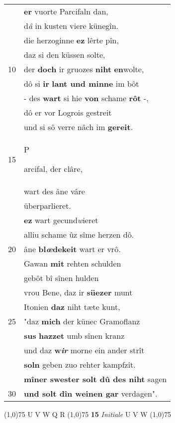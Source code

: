 \documentclass[8pt,a4paper,notitlepage]{article}
\begin{document}
\begin{table}[ht]
\begin{minipage}[t]{0.5\linewidth}
\begin{tabular}{rl}
 & \textbf{er} vuorte Parcifaln dan,\\ 
 & d\textit{â} in kusten viere künegîn.\\ 
 & die herzoginne \textbf{ez} lêrte pîn,\\ 
 & daz si den küssen solte,\\ 
10 & der \textbf{doch} ir gruozes \textbf{niht} \textbf{en}wolte,\\ 
 & dô si \textbf{ir} \textbf{lant und minne} im bôt\\ 
 & - des \textbf{wart} si hie \textbf{von} schame \textbf{rôt} -,\\ 
 & dô er vor Logrois gestreit\\ 
 & und si sô verre nâch im \textbf{gereit}.\\ 
15 & \begin{large}P\end{large}arcifal, der clâre,\\ 
 & wart des âne vâre\\ 
 & überparlieret.\\ 
 & \textbf{ez} wart gecund\textit{w}ieret\\ 
 & alliu schame ûz sîme herzen dô.\\ 
20 & âne \textbf{bl\textit{œ}dekeit} wart er vrô.\\ 
 & Gawan \textbf{mit} rehten schulden\\ 
 & gebôt bî sînen hulden\\ 
 & vrou Bene, daz ir \textbf{süezer} munt\\ 
 & Itonien \textbf{daz} niht tæte kunt,\\ 
25 & "daz \textbf{mich} der künec Gramoflanz\\ 
 & \textbf{sus} \textbf{hazzet} umb sînen kranz\\ 
 & und daz \textbf{w\textit{ir}} morne ein ander strît\\ 
 & \textbf{soln} geben zuo rehter kampfzît.\\ 
 & \textbf{mîner swester solt dû des niht} sagen\\ 
30 & \textbf{und solt dîn weinen gar} verdagen".\\ 
\end{tabular}
\scriptsize
\line(1,0){75} \newline
U V W Q R \newline
\line(1,0){75} \newline
\textbf{15} \textit{Initiale} U V W  \newline
\line(1,0){75} \newline

\end{minipage}
\end{table}
\end{document}
